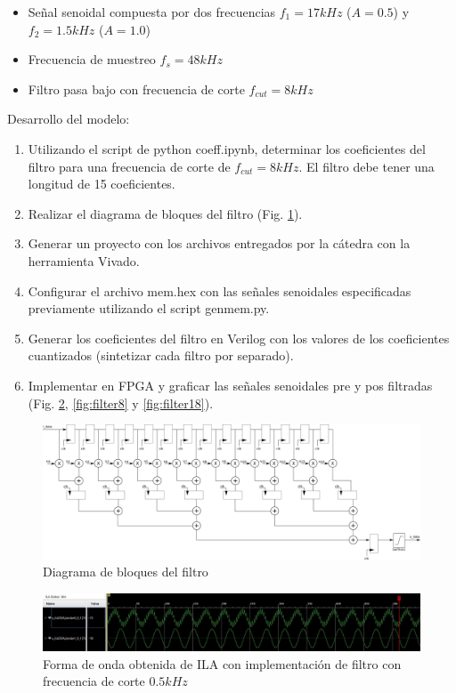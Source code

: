 \documentclass{article}
\begin{document}
\begin{itemize}
    \item Señal senoidal compuesta por dos frecuencias $f_{1} = 17 kHz$ ($A=0.5$) y $f_{2} = 1.5 kHz$ ($A=1.0$)
    \item Frecuencia de muestreo $f_{s} = 48 kHz$
    \item Filtro pasa bajo con frecuencia de corte $f_{cut} = 8 kHz$
\end{itemize}

Desarrollo del modelo:

\begin{enumerate}
    \item Utilizando el script de python coeff.ipynb, determinar los coeficientes del filtro para una frecuencia de corte de $f_{cut} = 8 kHz$. El filtro debe tener una longitud de 15 coeficientes.
    \item Realizar el diagrama de bloques del filtro (Fig. \ref{fig:block-diag}).
    \item Generar un proyecto con los archivos entregados por la cátedra con la herramienta Vivado.
    \item Configurar el archivo mem.hex con las señales senoidales especificadas previamente utilizando el script genmem.py.
    \item Generar los coeficientes del filtro en Verilog con los valores de los coeficientes cuantizados (sintetizar cada filtro por separado).
    \item Implementar en FPGA y graficar las señales senoidales pre y pos filtradas (Fig. \ref{fig:filter05}, \ref{fig:filter8} y \ref{fig:filter18}).
\end{enumerate}

\begin{figure}[ht]
    \centering
    \includegraphics[width=\textwidth]{block_diag.png}
    \caption{Diagrama de bloques del filtro}
    \label{fig:block-diag}
\end{figure}

\begin{figure}[ht]
    \centering
    \includegraphics[width=\textwidth]{impl-cutoff_0_5khz.jpg}
    \caption{Forma de onda obtenida de ILA con implementación de filtro con frecuencia de corte $0.5 kHz$}
    \label{fig:filter05}
\end{figure}
\end{document}
